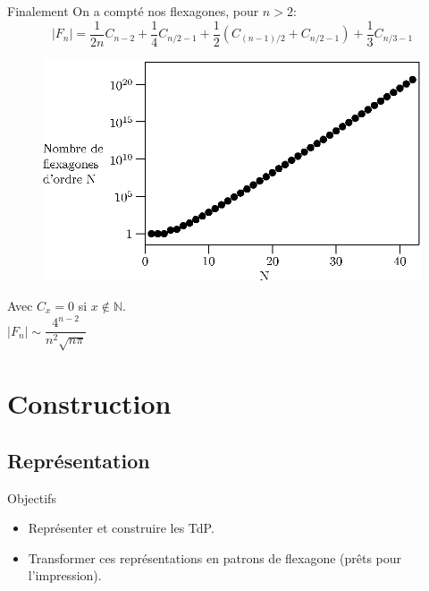 \documentclass[french,xcolor=dvipsnames]{beamer}
\begin{document}
		\begin{frame}{Finalement}
		On a compté nos flexagones, pour $n>2$:
		{\large
		\[
			|F_{n}| = \frac{1}{2n}C_{n-2} + \frac{1}{4}C_{n/2-1} + \frac{1}{2}(C_{(n-1)/2}+C_{n/2-1}) + \frac{1}{3}C_{n/3-1}
		\]
		}
		\begin{figure}
			\includegraphics[scale=0.6]{nombre_flexagones.eps}
		\end{figure}
		\begin{flushleft}
			Avec $C_{x} = 0$ si $x \not\in \mathbb{N}$.\\
		$|F_{n}| \sim \dfrac{4^{n-2}}{n^{2}\sqrt{n\pi}}$
		\end{flushleft}
	\end{frame}


	\section{Construction}
		\subsection{Représentation}
		
		\begin{frame}{Objectifs}
			\begin{itemize}
					\item Représenter et construire les TdP.
					\item Transformer ces représentations en patrons de flexagone (prêts pour l'impression).
			\end{itemize}		
		\end{frame}
\end{document}
